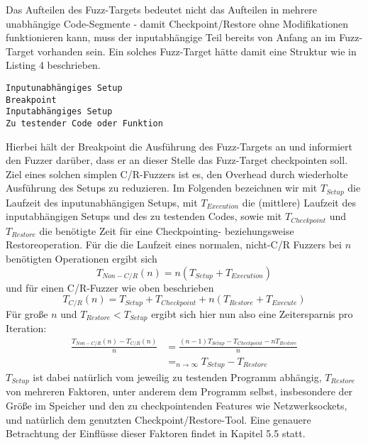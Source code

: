 \documentclass[a4paper]{article}
\begin{document}
Das Aufteilen des Fuzz-Targets bedeutet nicht das Aufteilen in mehrere unabhängige Code-Segmente - damit Checkpoint/Restore ohne Modifikationen funktionieren kann, muss der inputabhängige Teil bereits von Anfang an im Fuzz-Target vorhanden sein. 
Ein solches Fuzz-Target hätte damit eine Struktur wie in Listing 4 beschrieben.
\begin{lstlisting}[caption=Struktur C/R-Fuzzer-Fuzz-Target]
Inputunabhängiges Setup
Breakpoint
Inputabhängiges Setup
Zu testender Code oder Funktion
\end{lstlisting}
Hierbei hält der Breakpoint die Ausführung des Fuzz-Targets an und informiert den Fuzzer darüber, dass er an dieser Stelle das Fuzz-Target checkpointen soll.\\
Ziel eines solchen simplen C/R-Fuzzers ist es, den Overhead durch wiederholte Ausführung des Setups zu reduzieren.
Im Folgenden bezeichnen wir mit $T_{Setup}$ die Laufzeit des inputunabhängigen Setups, mit $T_{Execution}$ die (mittlere) Laufzeit des inputabhängigen Setups und des zu testenden Codes, sowie mit $T_{Checkpoint}$ und $T_{Restore}$ die benötigte Zeit für eine Checkpointing- beziehungsweise Restoreoperation. 
Für die die Laufzeit eines normalen, nicht-C/R Fuzzers bei $n$ benötigten Operationen ergibt sich
\begin{equation}
    T_{Non-C/R}(n) = n (T_{Setup} + T_{Execution})
\end{equation}
und für einen C/R-Fuzzer wie oben beschrieben
\begin{equation}
    T_{C/R}(n) = T_{Setup} + T_{Checkpoint} + n (T_{Restore} + T_{Execute})
\end{equation}
Für große $n$ und $T_{Restore} < T_{Setup}$ ergibt sich hier nun also eine Zeitersparnis pro Iteration:
\begin{equation}
    \begin{split}
        \frac{T_{Non-C/R}(n) - T_{C/R}(n)}{n} &= \frac{(n-1) T_{Setup} - T_{Checkpoint} - n T_{Restore}}{n} \\
        &=_{n \to \infty} T_{Setup} - T_{Restore}
    \end{split}
\end{equation}
$T_{Setup}$ ist dabei natürlich vom jeweilig zu testenden Programm abhängig, $T_{Restore}$ von mehreren Faktoren, unter anderem dem Programm selbst, insbesondere der Größe im Speicher und den zu checkpointenden Features wie Netzwerksockets, und natürlich dem genutzten Checkpoint/Restore-Tool. Eine genauere Betrachtung der Einflüsse dieser Faktoren findet in Kapitel 5.5 statt.
\end{document}
